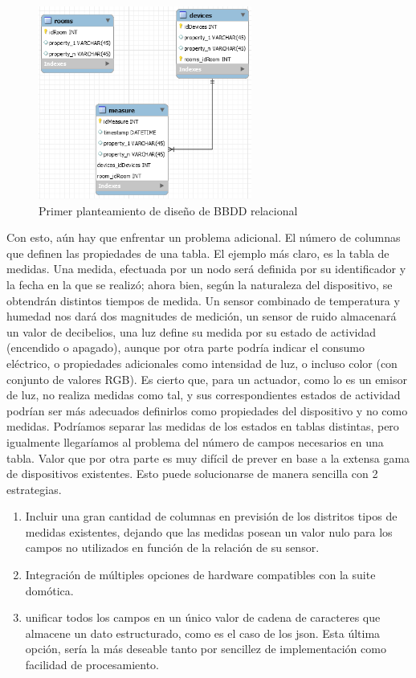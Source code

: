 \begin{figure}[hbt!]
\centering
\label{sqlschema2}
\includegraphics[height=2.5in]{figures/SQLSchemaExample_2.png}
\caption[Segundo planteamiento de diseño de BBDD relacional]{Primer planteamiento de diseño de BBDD relacional\footnotemark}
\end{figure}

\vspace{1cm}

Con esto, aún hay que enfrentar un problema adicional. El número de columnas que definen las propiedades de una tabla. El ejemplo más claro, es la tabla de medidas. Una medida, efectuada por un nodo será definida por su identificador y la fecha en la que se realizó; ahora bien, según la naturaleza del dispositivo, se obtendrán distintos tiempos de medida. Un sensor combinado de temperatura y humedad nos dará dos magnitudes de medición, un sensor de ruido almacenará un valor de decibelios, una luz define su medida por su estado de actividad (encendido o apagado), aunque por otra parte podría indicar el consumo eléctrico, o propiedades adicionales como intensidad de luz, o incluso color (con conjunto de valores RGB). Es cierto que, para un actuador, como lo es un emisor de luz, no realiza medidas como tal, y sus correspondientes estados de actividad podrían ser más adecuados definirlos como propiedades del dispositivo y no como medidas. Podríamos separar las medidas de los estados en tablas distintas, pero igualmente llegaríamos al problema del número de campos necesarios en una tabla. Valor que por otra parte es muy difícil de prever en base a la extensa gama de dispositivos existentes. Esto puede solucionarse de manera sencilla con 2 estrategias.

\begin{enumerate}
  \item Incluir una gran cantidad de columnas en previsión de los distritos tipos de medidas existentes, dejando que las medidas posean un valor nulo para los campos no utilizados en función de la relación de su sensor.

  \item Integración de múltiples opciones de hardware compatibles con la suite domótica.

  \item unificar todos los campos en un único valor de cadena de caracteres que almacene un dato estructurado, como es el caso de los \gls{json}. Esta última opción, sería la más deseable tanto por sencillez de implementación como facilidad de procesamiento.
\end{enumerate}

